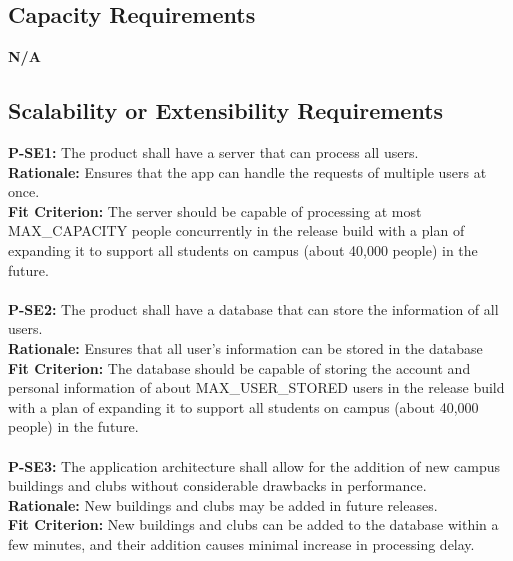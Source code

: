 \documentclass[12pt]{article}
\begin{document}
\subsection{Capacity Requirements}
  \textbf{N/A}\\

\subsection{Scalability or Extensibility Requirements}
  \textbf{P-SE1:} The product shall have a server that can process all users.\\
  \textbf{Rationale:} Ensures that the app can handle the requests of multiple users at once.\\
  \textbf{Fit Criterion:} The server should be capable of processing at most MAX\_CAPACITY people concurrently in the release build with a plan of expanding it to support all students on campus (about 40,000 people) in the future.\\\\
  \textbf{P-SE2:} The product shall have a database that can store the information of all users.\\
  \textbf{Rationale:} Ensures that all user's information can be stored in the database\\
  \textbf{Fit Criterion:} The database should be capable of storing the account and personal information of about MAX\_USER\_STORED users in the release build with a plan of expanding it to support all students on campus (about 40,000 people) in the future.\\\\
  \textbf{P-SE3:} The application architecture shall allow for the addition of new campus buildings and clubs without considerable drawbacks in performance.\\
  \textbf{Rationale:} New buildings and clubs may be added in future releases.\\
  \textbf{Fit Criterion:} New buildings and clubs can be added to the database within a few minutes, and their addition causes minimal increase in processing delay.\\\\
\end{document}
